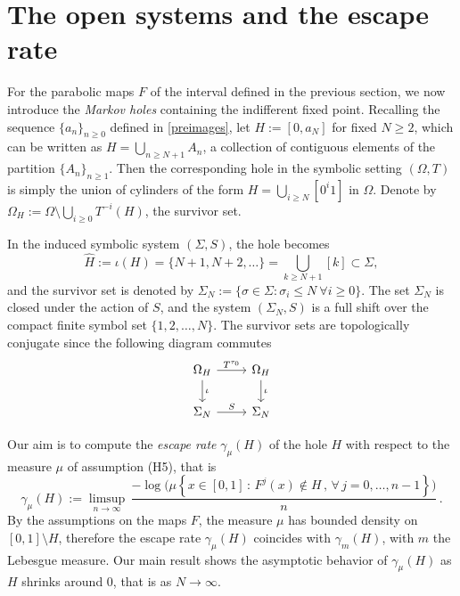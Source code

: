 \documentclass{amsart}
\theoremstyle{definition}
\theoremstyle{remark}
\theoremstyle{definition}
\numberwithin{equation}{section}
\newcommand{\set}[1]{\left\{#1\right\}}
\begin{document}
\section{The open systems and the escape rate} \label{sec:open}

For the parabolic maps $F$ of the interval defined in the previous section, we now introduce the \emph{Markov holes} containing the indifferent fixed point. Recalling the sequence $\{a_n\}_{n\ge 0}$ defined in \eqref{preimages}, let $H:=[0,a_{N}]$ for fixed $N\ge 2$, which can be written as $H =\bigcup_{n\ge N+1}A_{n}$, a collection of contiguous elements of the partition $\{A_{n}\}_{n \ge 1}$. Then the corresponding hole in the symbolic setting $(\Omega,T)$ is simply the union of cylinders of the form $H= \bigcup_{i \ge N} [0^{i} 1]$ in $\Omega$. Denote by $\Omega_{H} := \Omega \setminus \bigcup_{i \ge 0} T^{-i}(H)$, the survivor set. 

In the induced symbolic system $(\Sigma, S)$, the hole becomes 
\[
\hat{H}:=\iota(H) = \{ N+1, N+2, \dots \} =\bigcup\limits_{k \ge N+1}[k] \subset \Sigma,
\] 
and the survivor set is denoted by $\Sigma_{N} := \{ \sigma \in \Sigma : \sigma_{i} \le N \ \forall i \ge 0\}$. The set $\Sigma_{N}$ is closed under the action of $S$, and the system $(\Sigma_{N},S)$ is a full shift over the compact finite symbol set $\{ 1, 2, \dots, N \}$. The survivor sets are topologically conjugate since the following diagram commutes
    \[
    \begin{tikzcd}
     \Omega_{H} \arrow[r, "T^{\tau_{0}}"] \arrow[d, " \iota "]
    & \Omega_{H} \arrow[d, "\iota"] \\
    \Sigma_{N} \arrow[r, "S" ]
    & \Sigma_{N}
    \end{tikzcd}
     \]
    
Our aim is to compute the \emph{escape rate} $\gamma_\mu(H)$ of the hole $H$ with respect to the measure $\mu$ of assumption (H5), that is
\begin{equation}\label{escape-rate-F}
\gamma_\mu(H) := \limsup_{n\to \infty}\, \frac {-\log \Big( \mu\set{x\in [0,1]\, :\, F^j(x) \not\in H\, ,\, \forall\, j=0,\dots, n-1} \Big)}{n}\, .
\end{equation}
By the assumptions on the maps $F$, the measure $\mu$ has bounded density on $[0,1]\setminus H$, therefore the escape rate $\gamma_\mu(H)$ coincides with $\gamma_m(H)$, with $m$ the Lebesgue measure. Our main result shows the asymptotic behavior of $\gamma_\mu(H)$ as $H$ shrinks around 0, that is as $N\to \infty$.
\end{document}

